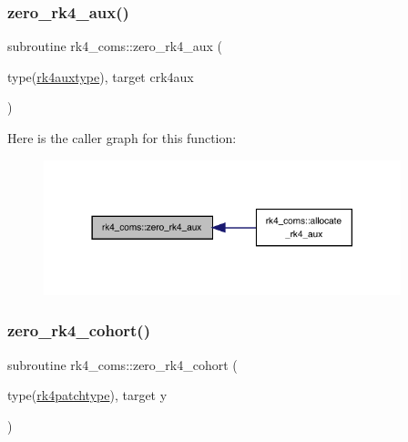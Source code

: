 \subsubsection{\texorpdfstring{zero\+\_\+rk4\+\_\+aux()}{zero\_rk4\_aux()}}
{\footnotesize\ttfamily subroutine rk4\+\_\+coms\+::zero\+\_\+rk4\+\_\+aux (\begin{DoxyParamCaption}\item[{type(\hyperlink{structrk4__coms_1_1rk4auxtype}{rk4auxtype}), target}]{crk4aux }\end{DoxyParamCaption})}

Here is the caller graph for this function\+:
\nopagebreak
\begin{figure}[H]
\begin{center}
\leavevmode
\includegraphics[width=294pt]{namespacerk4__coms_a0af8d3f6d5452c98c81c5230f3b22343_icgraph}
\end{center}
\end{figure}
\mbox{\label{namespacerk4__coms_a1053434edb41147cb74257d6339eab8f}} 
\subsubsection{\texorpdfstring{zero\+\_\+rk4\+\_\+cohort()}{zero\_rk4\_cohort()}}
{\footnotesize\ttfamily subroutine rk4\+\_\+coms\+::zero\+\_\+rk4\+\_\+cohort (\begin{DoxyParamCaption}\item[{type(\hyperlink{structrk4__coms_1_1rk4patchtype}{rk4patchtype}), target}]{y }\end{DoxyParamCaption})}

